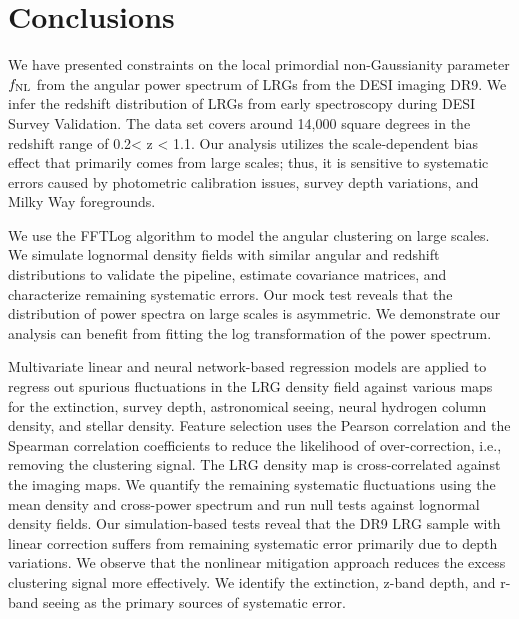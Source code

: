 \section{Conclusions}\label{sec:conclusion}
We have presented constraints on the local primordial non-Gaussianity parameter $f_{\rm NL}$ from the angular power spectrum of LRGs from the DESI imaging DR9. We infer the redshift distribution of LRGs from early spectroscopy during DESI Survey Validation. The data set covers around 14,000 square degrees in the redshift range of 0.2< z < 1.1. Our analysis utilizes the scale-dependent bias effect that primarily comes from large scales; thus, it is sensitive to systematic errors caused by photometric calibration issues, survey depth variations, and Milky Way foregrounds. 

We use the FFTLog algorithm to model the angular clustering on large scales. We simulate lognormal density fields with similar angular and redshift distributions to validate the pipeline, estimate covariance matrices, and characterize remaining systematic errors. Our mock test reveals that the distribution of power spectra on large scales is asymmetric. We demonstrate our analysis can benefit from fitting the log transformation of the power spectrum. 

Multivariate linear and neural network-based regression models are applied to regress out spurious fluctuations in the LRG density field against various maps for the extinction, survey depth, astronomical seeing, neural hydrogen column density, and stellar density. Feature selection uses the Pearson correlation and the Spearman correlation coefficients to reduce the likelihood of over-correction, i.e., removing the clustering signal. The LRG density map is cross-correlated against the imaging maps. We quantify the remaining systematic fluctuations using the mean density and cross-power spectrum and run null tests against lognormal density fields. Our simulation-based tests reveal that the DR9 LRG sample with linear correction suffers from remaining systematic error primarily due to depth variations. We observe that the nonlinear mitigation approach reduces the excess clustering signal more effectively. We identify the extinction, z-band depth, and r-band seeing as the primary sources of systematic error. 

